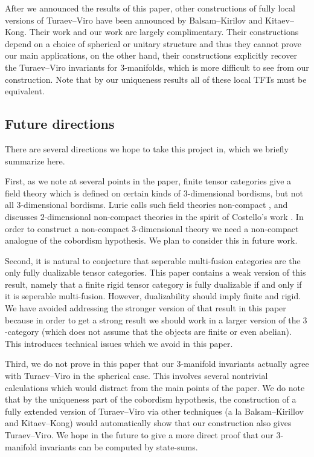 \documentclass{amsart}
\begin{document}
After we announced the results of this paper, other constructions of fully local versions of Turaev--Viro have been announced by Balsam--Kirilov and Kitaev--Kong.  Their work and our work are largely complimentary.  Their constructions depend on a choice of spherical or unitary structure and thus they cannot prove our main applications, on the other hand, their constructions explicitly recover the Turaev--Viro invariants for $3$-manifolds, which is more difficult to see from our construction.  Note that by our uniqueness results all of these local TFTs must be equivalent.

\subsection{Future directions}

There are several directions we hope to take this project in, which we briefly summarize here.

First, as we note at several points in the paper, finite tensor categories give a field theory which is defined on certain kinds of $3$-dimensional bordisms, but not all $3$-dimensional bordisms.  Lurie calls such field theories non-compact \cite[\S 4.2]{lurie-ch}, and discusses $2$-dimensional non-compact theories in the spirit of Costello's work \cite{MR2298823}.  In order to construct a non-compact $3$-dimensional theory we need a non-compact analogue of the cobordism hypothesis.  We plan to consider this in future work.

Second, it is natural to conjecture that seperable multi-fusion categories are the only fully dualizable tensor categories.  This paper contains a weak version of this result, namely that a finite rigid tensor category is fully dualizable if and only if it is seperable multi-fusion.  However, dualizability should imply finite and rigid.  We have avoided addressing the stronger version of that result in this paper because in order to get a strong result we should work in a larger version of the $3$-category (which does not assume that the objects are finite or even abelian).  This introduces technical issues which we avoid in this paper.

Third, we do not prove in this paper that our $3$-manifold invariants actually agree with Turaev--Viro in the spherical case.  This involves several nontrivial calculations which would distract from the main points of the paper.  We do note that by the uniqueness part of the cobordism hypothesis, the construction of a fully extended version of Turaev--Viro via other techniques (a la Balsam--Kirillov and Kitaev--Kong) would automatically show that our construction also gives Turaev--Viro.  We hope in the future to give a more direct proof that our $3$-manifold invariants can be computed by state-sums.
\end{document}
